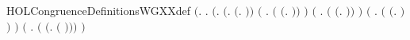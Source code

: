 \begin{SaveVerbatim}{HOLCongruenceDefinitionsWGXXdef}
\HOLTokenTurnstile{}  \HOLSymConst{\ensuremath{=}}
   \ensuremath{(}\HOLTokenLambda{}.
        \HOLSymConst{\HOLTokenForall{}}.
            \ensuremath{(}\HOLSymConst{\HOLTokenForall{}}.
                 \ensuremath{(}\HOLSymConst{\HOLTokenExists{}}.  \HOLSymConst{\ensuremath{=}} \ensuremath{(}\HOLTokenLambda{}. \ensuremath{)}\ensuremath{)} \HOLSymConst{\HOLTokenDisj{}}
                 \ensuremath{(}\HOLSymConst{\HOLTokenExists{}} . \ensuremath{(} \HOLSymConst{\ensuremath{=}} \ensuremath{(}\HOLTokenLambda{}. \HOLSymConst{\ensuremath{\ldotp}} \ensuremath{)}\ensuremath{)} \HOLSymConst{\HOLTokenConj{}}  \ensuremath{)} \HOLSymConst{\HOLTokenDisj{}}
                 \ensuremath{(}\HOLSymConst{\HOLTokenExists{}} .
                      \ensuremath{(} \HOLSymConst{\ensuremath{=}} \ensuremath{(}\HOLTokenLambda{}.   \HOLSymConst{\ensuremath{+}}  \ensuremath{)}\ensuremath{)} \HOLSymConst{\HOLTokenConj{}}   \HOLSymConst{\HOLTokenConj{}}  \ensuremath{)} \HOLSymConst{\HOLTokenDisj{}}
                 \ensuremath{(}\HOLSymConst{\HOLTokenExists{}} .
                      \ensuremath{(} \HOLSymConst{\ensuremath{=}} \ensuremath{(}\HOLTokenLambda{}.   \HOLSymConst{\ensuremath{\mid}}  \ensuremath{)}\ensuremath{)} \HOLSymConst{\HOLTokenConj{}}   \HOLSymConst{\HOLTokenConj{}}  \ensuremath{)} \HOLSymConst{\HOLTokenDisj{}}
                 \ensuremath{(}\HOLSymConst{\HOLTokenExists{}} . \ensuremath{(} \HOLSymConst{\ensuremath{=}} \ensuremath{(}\HOLTokenLambda{}.   \ensuremath{(} \ensuremath{)}\ensuremath{)}\ensuremath{)} \HOLSymConst{\HOLTokenConj{}}  \ensuremath{)} \HOLSymConst{\HOLTokenDisj{}}

\end{SaveVerbatim}
